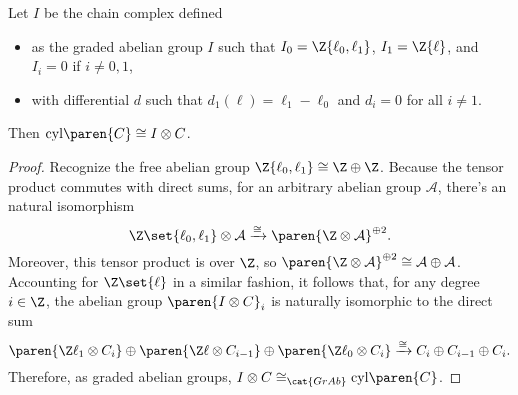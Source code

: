 \documentclass[twosided]{ccg-pset}
\newcommand{\cyl}[1]{\mathrm{cyl}\paren{#1}}
\begin{document}
\begin{enumerate}
        \begin{claim*}
            \label{claim:the_mapping_cylinder_is_a_tensor_product_of_complexes}
            Let $I$ be the chain complex defined
                    \begin{itemize}
                        \item as the graded abelian group $I$ such that $I_0 = \Z\{\ell_0, \ell_1\}$, $I_1 = \Z\{\ell\}$, and $I_i = 0$ if $i \neq 0,1$,
                        \item with differential $d$ such that $d_1(\ell) = \ell_1 - \ell_0$ and $d_i = 0$ for all $i \neq 1$.
                    \end{itemize}
            Then $\cyl C \cong I \otimes C$.
        \end{claim*}
        \begin{proof}
            Recognize the free abelian group $\Z\{\ell_0, \ell_1\} \cong \Z \oplus \Z$. 
            Because the tensor product commutes with direct sums, for an arbitrary abelian group $\mathcal{A}$, there's an natural isomorphism 
            \begin{equation*}
                \Z\set{\ell_0, \ell_1} \otimes \mathcal{A} \xrightarrow{\cong} \paren{ \Z \otimes \mathcal{A} }^{\oplus 2}.
            \end{equation*} 
            Moreover, this tensor product is over $\Z$, so $\paren{ \Z \otimes \mathcal{A} }^{\oplus 2} \cong \mathcal{A} \oplus \mathcal{A}$.
            Accounting for $\Z\set{\ell}$ in a similar fashion, it follows that, for any degree $i \in \Z$, the abelian group $\paren{I \otimes C}_i$ is naturally isomorphic to the direct sum 
            \begin{equation}
                \label{isom}
                \paren{\Z\ell_1 \otimes C_i} \oplus \paren{\Z\ell \otimes C_{i-1}} \oplus \paren{\Z\ell_0 \otimes C_i} 
                    \xrightarrow{\cong} C_i \oplus C_{i-1} \oplus C_i.
            \end{equation}
            Therefore, as graded abelian groups, $I \otimes C \cong_{\cat{GrAb}} \cyl C$.


\end{proof}
\end{enumerate}
\end{document}
